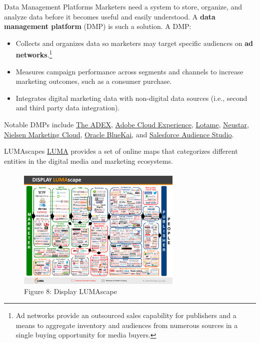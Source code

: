 \documentclass[pdf]{beamer}
\newcommand{\empr}[1]{{\color{franklinblue}\textbf{#1}}}
\theoremstyle{remark}
\theoremstyle{definition}
\begin{document}
\begin{frame}[t]{Data Management Platforms}
Marketers need a system to store, organize, and analyze data before it becomes useful and easily understood. A \empr{data management platform} (DMP) is such a solution. A DMP: \\
\vspace{0.0ex}
\small
\begin{itemize}
\item Collects and organizes data so marketers may target specific audiences on \empr{ad networks}.\footnote{Ad networks provide an outsourced sales capability for publishers and a means to aggregate inventory and audiences from numerous sources in a single buying opportunity for media buyers.} 
\item Measures campaign performance across segments and channels to increase marketing outcomes, such as a consumer purchase.
\item Integrates digital marketing data with non-digital data sources (i.e., second and third party data integration).
\end{itemize}
\vspace{-1.0ex}
\normalsize
Notable DMPs include \href{https://theadex.com/}{The ADEX}, \href{https://business.adobe.com/what-is-experience-cloud.html}{Adobe Cloud Experience}, \href{https://www.lotame.com/}{Lotame}, \href{https://www.home.neustar/}{Neustar}, \href{https://www.nielsen.com/solutions/media-planning/marketing-cloud/}{Nielsen Marketing Cloud}, \href{https://www.oracle.com/cx/marketing/data-management-platform/}{Oracle BlueKai}, and \href{https://www.salesforce.com/products/marketing-cloud/data-management/}{Salesforce Audience Studio}.
\end{frame}

\begin{frame}[t]{LUMAscapes}
\href{https://lumapartners.com/luma-content/\#lumascapes}{LUMA} provides a set of online maps that categorizes different entities in the digital media and marketing ecosystems. \\
\vspace{1.5ex}
\begin{figure}[htbp]
    \centering
    \captionsetup{justification=centering}
    \includegraphics[clip, trim=0cm 0.2cm 0cm 0.2cm, width=0.7\textwidth]{Images/Display_LUMAscape.pdf}  
     \caption{Figure {\color{franklinblue} 8}: Display LUMAscape}
    \label{fig:displayluma}
\end{figure}
\end{frame}
\end{document}
